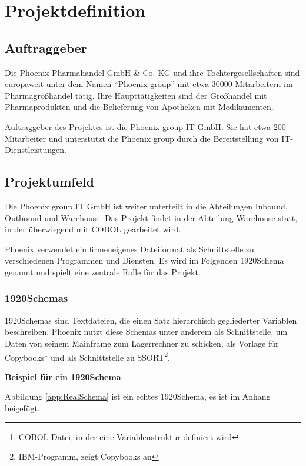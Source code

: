 \section{Projektdefinition}
\label{sec:Einleitung}
\subsection{Auftraggeber}
\label{sec:Auftraggeber}
Die Phoenix Pharmahandel GmbH \& Co. KG und ihre Tochtergesellschaften sind europaweit unter dem Namen ``Phoenix group'' mit etwa 30000 Mitarbeitern im Pharmagroßhandel tätig. Ihre Haupttätigkeiten sind der Großhandel mit Pharmaprodukten und die Belieferung von Apotheken mit Medikamenten.

Auftraggeber des Projektes ist die Phoenix group IT GmbH. Sie hat etwa 200 Mitarbeiter und unterstützt die Phoenix group durch die Bereitstellung von IT-Dienstleistungen.

\subsection{Projektumfeld} 
\label{sec:Projektumfeld}
Die Phoenix group IT GmbH ist weiter unterteilt in die Abteilungen Inbound, Outbound und Warehouse. Das Projekt findet in der Abteilung Warehouse statt, in der überwiegend mit COBOL gearbeitet wird.

Phoenix verwendet ein firmeneigenes Dateiformat als Schnittstelle zu verschiedenen Programmen und Diensten. Es wird im Folgenden 1920Schema genannt und spielt eine zentrale Rolle für das Projekt.

\subsubsection{1920Schemas}
1920Schemas sind Textdateien, die einen Satz hierarchisch gegliederter Variablen beschreiben. Phoenix nutzt diese Schemas unter anderem als Schnittstelle, um Daten von seinem Mainframe zum Lagerrechner zu schicken, als Vorlage für Copybooks\footnote{COBOL-Datei, in der eine Variablenstruktur definiert wird} und als Schnittstelle zu SSORT\footnote{IBM-Programm, zeigt Copybooks an}.

\textbf{Beispiel für ein 1920Schema}

Abbildung \ref{app:RealSchema} ist ein echtes 1920Schema, es ist im Anhang beigefügt.

